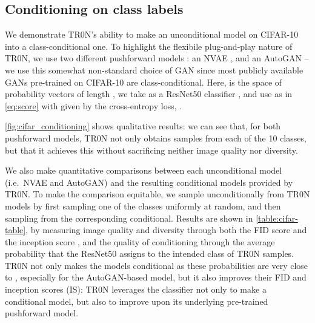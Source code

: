 \documentclass[nohyperref]{article}
\theoremstyle{plain}
\theoremstyle{definition}
\theoremstyle{remark}
\begin{document}
\subsection{Conditioning on class labels}

We demonstrate TR0N's ability to make an unconditional model on CIFAR-10 \citep{krizhevsky2009learning} into a class-conditional one. To highlight the flexibile plug-and-play nature of TR0N, we use two different pushforward models : an NVAE \citep{Vahdat2020NVAEAD}, and an AutoGAN \citep{Gong2019AutoGANNA} -- we use this somewhat non-standard choice of GAN since most publicly available GANs pre-trained on CIFAR-10 are class-conditional. 
Here,  is the space of probability vectors of length , we take  as a ResNet50 classifier \cite{He2015DeepRL}, and use  as in \eqref{eq:score} with  given by the cross-entropy loss, .

\autoref{fig:cifar_conditioning} shows qualitative results: we can see that, for both pushforward models, TR0N not only obtains samples from each of the 10 classes, but that it achieves this without sacrificing neither image quality nor diversity. 

We also make quantitative comparisons between each unconditional model (i.e.\ NVAE and AutoGAN) and the resulting conditional models provided by TR0N. To make the comparison equitable, we sample unconditionally from TR0N models by first sampling one of the  classes uniformly at random, and then sampling from the corresponding conditional. Results are shown in \autoref{table:cifar-table}, by measuring image quality and diversity through both the FID score and the inception score \citep{salimans2016improved}, and the quality of conditioning through the average probability that the ResNet50 assigns to the intended class of TR0N samples. TR0N not only makes the models conditional as these probabilities are very close to , especially for the AutoGAN-based model, but it also improves their FID and inception scores (IS): TR0N leverages the classifier  not only to make a conditional model, but also to improve upon its underlying pre-trained pushforward model.
\end{document}

